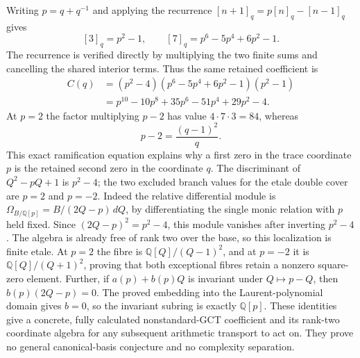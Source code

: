 Writing $p=q+q^{-1}$ and applying the recurrence
$[n+1]_q=p[n]_q-[n-1]_q$ gives
\[
 [3]_q=p^2-1,\qquad [7]_q=p^6-5p^4+6p^2-1.
\]
The recurrence is verified directly by multiplying the two finite
sums and cancelling the shared interior terms.  Thus the same retained
coefficient is
\begin{align*}
 C(q)
  &=(p^2-4)(p^6-5p^4+6p^2-1)(p^2-1)\\
  &=p^{10}-10p^8+35p^6-51p^4+29p^2-4.
\end{align*}
At $p=2$ the factor multiplying $p-2$ has value
$4\cdot7\cdot3=84$, whereas
\[
 p-2=\frac{(q-1)^2}{q}.
\]
This exact ramification equation explains why a first zero in the trace
coordinate $p$ is the retained second zero in the coordinate $q$.
The discriminant of $Q^2-pQ+1$ is $p^2-4$; the two excluded branch
values for the etale double cover are $p=2$ and $p=-2$.
Indeed the relative differential module is
$\Omega_{B/\mathbb Q[p]}=B/(2Q-p)\,dQ$, by differentiating the single
monic relation with $p$ held fixed.  Since $(2Q-p)^2=p^2-4$, this module
vanishes after inverting $p^2-4$.  The algebra is already free of rank
two over the base, so this localization is finite etale.  At $p=2$ the
fibre is $\mathbb Q[Q]/(Q-1)^2$, and at $p=-2$ it is
$\mathbb Q[Q]/(Q+1)^2$, proving that both exceptional fibres retain a
nonzero square-zero element.  Further, if $a(p)+b(p)Q$ is invariant under
$Q\mapsto p-Q$, then $b(p)(2Q-p)=0$.  The proved embedding into the
Laurent-polynomial domain gives $b=0$, so the invariant subring is
exactly $\mathbb Q[p]$.
These identities give a concrete, fully calculated nonstandard-GCT
coefficient and its rank-two coordinate algebra for any subsequent
arithmetic transport to act on.  They prove no general canonical-basis
conjecture and no complexity separation.
